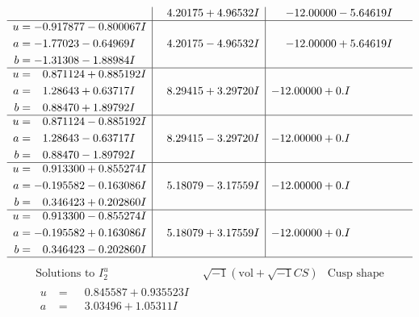 \documentclass[1p]{elsarticle_modified}
\theoremstyle{definition}
\newcommand{\I}{\sqrt{-1}}
\begin{document}
$$\begin{array}{c|c|c}
 & \phantom{-}4.20175 + 4.96532 I & -12.00000 - 5.64619 I \\ \hline\begin{aligned}
u &= -0.917877 - 0.800067 I \\
a &= -1.77023 - 0.64969 I \\
b &= -1.31308 - 1.88984 I\end{aligned}
 & \phantom{-}4.20175 - 4.96532 I & -12.00000 + 5.64619 I \\ \hline\begin{aligned}
u &= \phantom{-}0.871124 + 0.885192 I \\
a &= \phantom{-}1.28643 + 0.63717 I \\
b &= \phantom{-}0.88470 + 1.89792 I\end{aligned}
 & \phantom{-}8.29415 + 3.29720 I & -12.00000 + 0. I\phantom{ +0.000000I} \\ \hline\begin{aligned}
u &= \phantom{-}0.871124 - 0.885192 I \\
a &= \phantom{-}1.28643 - 0.63717 I \\
b &= \phantom{-}0.88470 - 1.89792 I\end{aligned}
 & \phantom{-}8.29415 - 3.29720 I & -12.00000 + 0. I\phantom{ +0.000000I} \\ \hline\begin{aligned}
u &= \phantom{-}0.913300 + 0.855274 I \\
a &= -0.195582 - 0.163086 I \\
b &= \phantom{-}0.346423 + 0.202860 I\end{aligned}
 & \phantom{-}5.18079 - 3.17559 I & -12.00000 + 0. I\phantom{ +0.000000I} \\ \hline\begin{aligned}
u &= \phantom{-}0.913300 - 0.855274 I \\
a &= -0.195582 + 0.163086 I \\
b &= \phantom{-}0.346423 - 0.202860 I\end{aligned}
 & \phantom{-}5.18079 + 3.17559 I & -12.00000 + 0. I\phantom{ +0.000000I}\\
 \hline 
 \end{array}$$\newpage$$\begin{array}{c|c|c}  
\text{Solutions to }I^u_{2}& \I (\text{vol} + \sqrt{-1}CS) & \text{Cusp shape}\\
 \hline 
\begin{aligned}
u &= \phantom{-}0.845587 + 0.935523 I \\
a &= \phantom{-}3.03496 + 1.05311 I \\

\end{aligned}
\end{array}$$
\end{document}
